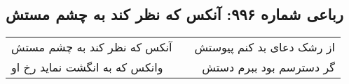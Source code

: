 \begin{center}
\section*{رباعی شماره ۹۹۶: آنکس که نظر کند به چشم مستش}
\label{sec:0996}
\begin{longtable}{l p{0.5cm} r}
آنکس که نظر کند به چشم مستش
&&
از رشک دعای بد کنم پیوستش
\\
وانکس که به انگشت نماید رخ او
&&
گر دسترسم بود ببرم دستش
\\
\end{longtable}
\end{center}
